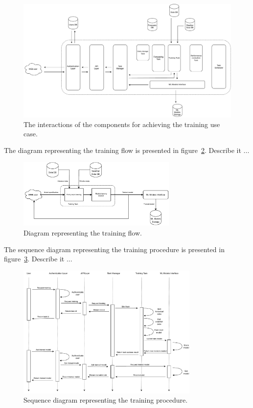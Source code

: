 \begin{figure}[H]
\centering 
\includegraphics[width=1\textwidth]{images/architecture_training_interactions}
\caption{The interactions of the components for achieving the training use case.}
\label{fig:traininginteractions}
\end{figure}

The diagram representing the training flow is presented in figure~\ref{fig:trainingflow}.
Describe it ...

\begin{figure}[H]
\centering 
\includegraphics[width=0.7\textwidth]{images/architecture_training_flow}
\caption{Diagram representing the training flow.}
\label{fig:trainingflow}
\end{figure}

The sequence diagram representing the training procedure is presented in figure~\ref{fig:trainingsequence}.
Describe it ...

\begin{figure}[H]
\centering 
\includegraphics[width=0.8\textwidth]{images/architecture_training_sequence}
\caption{Sequence diagram representing the training procedure.}
\label{fig:trainingsequence}
\end{figure}


